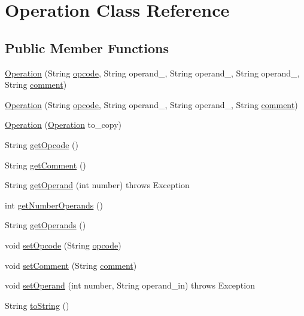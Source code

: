 \hypertarget{classOperation}{
\section{Operation Class Reference}
\label{classOperation}
}
\subsection*{Public Member Functions}
\begin{DoxyCompactItemize}
\item 
\hyperlink{classOperation_ab2788c0fe03cd2bcaff181c4dee97926}{Operation} (String \hyperlink{classOperation_a91a69611ab1dd4ca12de1abdd49c2b42}{opcode}, String operand\_, String operand\_, String operand\_, String \hyperlink{classOperation_a3b56588030b54deb7ffb0c5f0a4ebe68}{comment})
\item 
\hyperlink{classOperation_a97023afc59e830213c45632782c003a9}{Operation} (String \hyperlink{classOperation_a91a69611ab1dd4ca12de1abdd49c2b42}{opcode}, String operand\_, String operand\_, String \hyperlink{classOperation_a3b56588030b54deb7ffb0c5f0a4ebe68}{comment})
\item 
\hyperlink{classOperation_ad4446a177e8fee8190c847711dd040e3}{Operation} (\hyperlink{classOperation}{Operation} to\_\-copy)
\item 
String \hyperlink{classOperation_a1fee9b845f368eaa45f8c3a59fdc6768}{getOpcode} ()
\item 
String \hyperlink{classOperation_aa1f781d95004579b19a32edd7cf13b53}{getComment} ()
\item 
String \hyperlink{classOperation_a532c5b1c649dfa9864279f545f5e0b8d}{getOperand} (int number)  throws Exception
\item 
int \hyperlink{classOperation_a8edbc7a9746ccdc715d0a859bbc6679e}{getNumberOperands} ()
\item 
String \hyperlink{classOperation_a1e310aee2b5aeefa8094d2197816af9b}{getOperands} ()
\item 
void \hyperlink{classOperation_ac8493946ebb2ff362b7a9826c515aef4}{setOpcode} (String \hyperlink{classOperation_a91a69611ab1dd4ca12de1abdd49c2b42}{opcode})
\item 
void \hyperlink{classOperation_a4bb7b2db5560ac84940f305207b31404}{setComment} (String \hyperlink{classOperation_a3b56588030b54deb7ffb0c5f0a4ebe68}{comment})
\item 
void \hyperlink{classOperation_af84aceab243ad1c694e749b83a233d1a}{setOperand} (int number, String operand\_\-in)  throws Exception
\item 
String \hyperlink{classOperation_a14f47977fe6f954977bbe1fc558c7174}{toString} ()
\end{DoxyCompactItemize}
